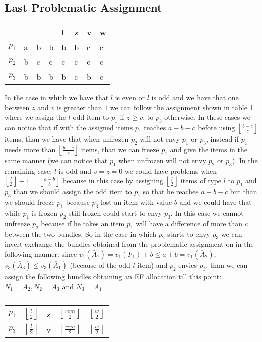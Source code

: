 \documentclass{article}
\newcommand{\floor}[3][2]{\left \lfloor\frac{#2}{#3}\right \rfloor}
\begin{document}
\subsection{Last Problematic Assignment}
\begin{table}[h]
    \centering
    \begin{tabular}{|l|l|l|l|l|l|l|l|}
        \hline
            &   &   &   & l & z & v & w \\ \hline
        $p_1$ & a & b & b & b & b & c & c \\ \hline
        $p_2$ & b & c & c & c & c & c & c \\ \hline
        $p_3$ & b & b & b & b & c & b & c \\ \hline
    \end{tabular}
\end{table}
In the case in which we have that $l$ is even or $l$ is odd and we have that one between $z$ and $v$ is greater than $1$ we can follow the assignment shown in table \ref{table:abb-bcc-bbb-first-assignment} where we assign the $l$ odd item to $p_1$ if $z\ge v$, to $p_3$ otherwise. In these cases we can notice that if with the assigned items $p_1$ reaches $a-b-c$ before using $\floor{b-c}{c}$ items, than we have that when unfrozen $p_2$ will not envy $p_1$ or $p_3$, instead if $p_1$ needs more than $\floor{b-c}{c}$ items, than we can freeze $p_1$ and give the items in the same manner (we can notice that $p_1$ when unfrozen will not envy $p_2$ or $p_3$). In the remaining case: $l$ is odd and $v=z=0$ we could have problems when $\floor{l}{2} + 1 = \floor{a-b}{b}$ because in this case by assigning $\floor{l}{2}$ items of type $l$ to $p_1$ and $p_3$ than we should assign the odd item to $p_1$ so that he reaches $a-b-c$ but than we should freeze $p_1$ because $p_3$ lost an item with value $b$ and we could have that while $p_1$ is frozen $p_2$ still frozen could start to envy $p_3$. In this case we cannot unfreeze $p_2$ because if he takes an item $p_1$ will have a difference of more than $c$ between the two bundles. So in the case in which $p_2$ starts to envy $p_3$ we can invert exchange the bundles obtained from the problematic assignment on in the following manner: since $v_1(\bar A_1) = v_1(F_1) + b \le a + b = v_1(\bar A_2)$, $v_3(\bar A_3) \le v_3(\bar A_1)$ (because of the odd $l$ item) and $p_2$ envies $p_3$, than we can assign the following bundles obtaining an EF allocation till this point: $N_1 = \bar A_2, N_2 = \bar A_3$ and $N_3 = \bar A_1$. 


\begin{table}[h]
\centering
    \begin{tabular}{|l|l|l|l|l|}
    \hline
    $p_1$ & $\floor{l}{2}$ & z & $\floor{rem}{2}$ & $\floor{w}{2}$ \\ \hline
    $p_3$ & $\floor{l}{2}$ & v & $\floor{rem}{2}$ & $\floor{w}{2}$ \\ \hline
    \end{tabular}
    \caption{}
    \label{table:abb-bcc-bbb-first-assignment}
\end{table}
\end{document}
